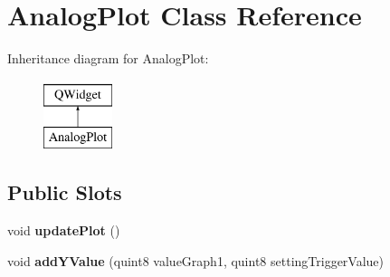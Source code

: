 \hypertarget{class_analog_plot}{}\section{Analog\+Plot Class Reference}
\label{class_analog_plot}
Inheritance diagram for Analog\+Plot\+:\begin{figure}[H]
\begin{center}
\leavevmode
\includegraphics[height=2.000000cm]{class_analog_plot}
\end{center}
\end{figure}
\subsection*{Public Slots}
\begin{DoxyCompactItemize}
\item 
\mbox{\label{class_analog_plot_a0ee4b4c42f7f2951be7cec9909ef6279}} 
void {\bfseries update\+Plot} ()
\item 
\mbox{\label{class_analog_plot_ae7adc51525f4aaf6151281bfe9ba7e34}} 
void {\bfseries add\+Y\+Value} (quint8 value\+Graph1, quint8 setting\+Trigger\+Value)
\end{DoxyCompactItemize}
